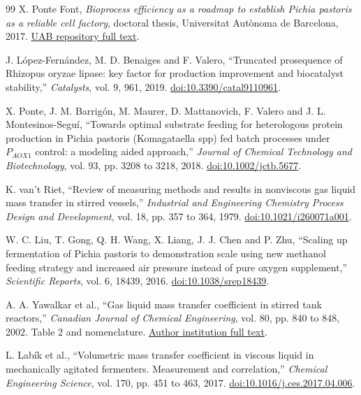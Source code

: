 \documentclass[12pt,a4paper]{article}
\begin{document}
\newpage
\begingroup
\onehalfspacing
\begin{thebibliography}{99}
\setlength{\itemsep}{7pt}
X. Ponte Font, \textit{Bioprocess efficiency as a roadmap to establish Pichia pastoris as a reliable cell factory}, doctoral thesis, Universitat Aut\`onoma de Barcelona, 2017. \href{https://ddd.uab.cat/pub/tesis/2017/hdl_10803_457712/xpf1de1.pdf}{UAB repository full text}.

J. L\'opez-Fern\'andez, M. D. Benaiges and F. Valero, ``Truncated prosequence of Rhizopus oryzae lipase: key factor for production improvement and biocatalyst stability,'' \textit{Catalysts}, vol. 9, 961, 2019. \href{https://doi.org/10.3390/catal9110961}{doi:10.3390/catal9110961}.

X. Ponte, J. M. Barrig\'on, M. Maurer, D. Mattanovich, F. Valero and J. L. Montesinos-Segu\'i, ``Towards optimal substrate feeding for heterologous protein production in Pichia pastoris (Komagataella spp) fed batch processes under $P_{AOX1}$ control: a modeling aided approach,'' \textit{Journal of Chemical Technology and Biotechnology}, vol. 93, pp. 3208 to 3218, 2018. \href{https://doi.org/10.1002/jctb.5677}{doi:10.1002/jctb.5677}.

K. van't Riet, ``Review of measuring methods and results in nonviscous gas liquid mass transfer in stirred vessels,'' \textit{Industrial and Engineering Chemistry Process Design and Development}, vol. 18, pp. 357 to 364, 1979. \href{https://doi.org/10.1021/i260071a001}{doi:10.1021/i260071a001}.

W. C. Liu, T. Gong, Q. H. Wang, X. Liang, J. J. Chen and P. Zhu, ``Scaling up fermentation of Pichia pastoris to demonstration scale using new methanol feeding strategy and increased air pressure instead of pure oxygen supplement,'' \textit{Scientific Reports}, vol. 6, 18439, 2016. \href{https://doi.org/10.1038/srep18439}{doi:10.1038/srep18439}.

A. A. Yawalkar et al., ``Gas liquid mass transfer coefficient in stirred tank reactors,'' \textit{Canadian Journal of Chemical Engineering}, vol. 80, pp. 840 to 848, 2002. Table 2 and nomenclature. \href{https://pure.rug.nl/ws/portalfiles/portal/14527504/2002CanJChemEngYawalkar2.pdf}{Author institution full text}.

L. Lab\'ik et al., ``Volumetric mass transfer coefficient in viscous liquid in mechanically agitated fermenters. Measurement and correlation,'' \textit{Chemical Engineering Science}, vol. 170, pp. 451 to 463, 2017. \href{https://doi.org/10.1016/j.ces.2017.04.006}{doi:10.1016/j.ces.2017.04.006}.


\end{thebibliography}
\end{document}

